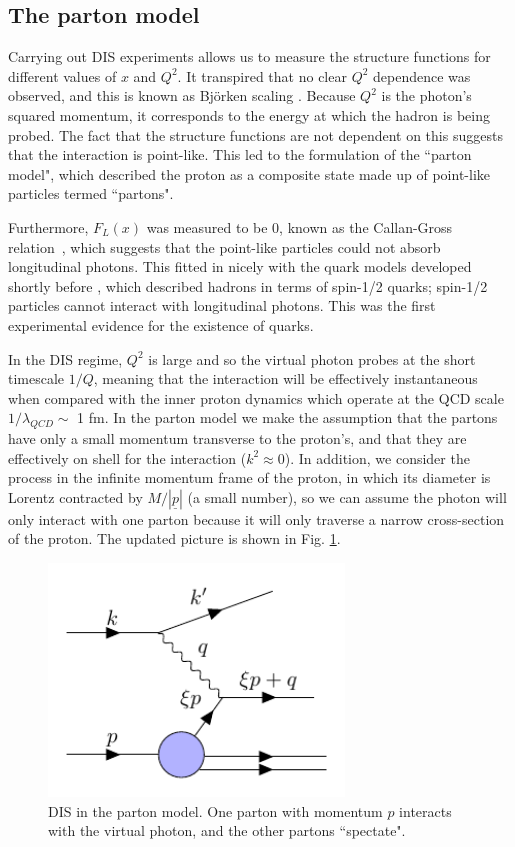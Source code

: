 \subsection{The parton model}
Carrying out DIS experiments allows us to measure the structure functions for different values of $x$ and $Q^2$. It transpired that no clear $Q^2$ dependence was observed, and this is known as Bj\"orken scaling \cite{Callan:1973pu}. Because $Q^2$ is the photon's squared momentum, it corresponds to the energy at which the hadron is being probed. The fact that the structure functions are not dependent on this suggests that the interaction is point-like. This led to the formulation of the ``parton model", which described the proton as a composite state made up of point-like particles termed ``partons"\cite{Feynman:1969wa, Feynman:1969ej, Feynman:1973xc}. 

Furthermore, $F_L(x)$ was measured to be 0, known as the Callan-Gross relation~\cite{Callan:1968zza, Callan:1973pu}, which suggests that the point-like particles could not absorb longitudinal photons. This fitted in nicely with the quark models developed shortly before \cite{GellMann:1962xb, GellMann:1964nj, Zweig:1964jf, Dothan:1965aa}, which described hadrons in terms of spin-1/2 quarks; spin-1/2 particles cannot interact with longitudinal photons. This was the first experimental evidence for the existence of quarks.

In the DIS regime, $Q^2$ is large and so the virtual photon probes at the short timescale $1/Q$, meaning that the interaction will be effectively instantaneous when compared with the inner proton dynamics which operate at the QCD scale $1/\lambda_{QCD} \sim $ 1 fm.  In the parton model we make the assumption that the partons have only a small momentum transverse to the proton's, and that they are effectively on shell for the interaction ($k^2 \approx 0$). In addition, we consider the process in the infinite momentum frame of the proton, in which its diameter is Lorentz contracted by $M/|\underline{p}|$ (a small number), so we can assume the photon will only interact with one parton because it will only traverse a narrow cross-section of the proton. The updated picture is shown in Fig. \ref{fig:disparton}.
\begin{figure}[h]
\centering
\includegraphics[width=0.7\textwidth]{../diagrams/parton_dis.pdf}
\caption{\label{fig:disparton}DIS in the parton model. One parton with momentum $p$ interacts with the virtual photon, and the other partons ``spectate".}
\end{figure}

